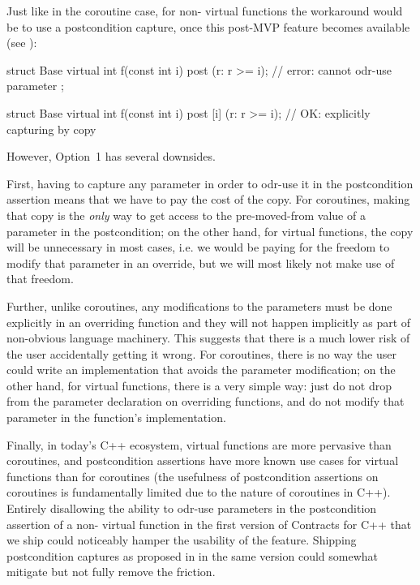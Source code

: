 Just like in the coroutine case, for non- virtual functions the workaround would be to use a postcondition capture, once this post-MVP feature becomes available (see \cite{P3098R0}):
\begin{codeblock}
struct Base {
  virtual int f(const int i) post (r: r >= i);     // error: cannot odr-use parameter  
};

struct Base {
  virtual int f(const int i) post [i] (r: r >= i); // OK: explicitly capturing  by copy
}
\end{codeblock}

However, Option~1 has several downsides.

First, having to capture any parameter in order to odr-use it in the postcondition assertion means that we have to pay the cost of the copy. For coroutines, making that copy is the \emph{only} way to get access to the pre-moved-from value of a parameter in the postcondition; on the other hand, for virtual functions, the copy will be unnecessary in most cases, i.e. we would be paying for the freedom to modify that parameter in an override, but we will most likely not make use of that freedom.

Further, unlike coroutines, any modifications to the parameters must be done explicitly in an overriding function and they will not happen implicitly as part of non-obvious language machinery. This suggests that there is a much lower risk of the user accidentally getting it wrong. For coroutines, there is no way the user could write an implementation that avoids the parameter modification; on the other hand, for virtual functions, there is a very simple way: just do not drop  from the parameter declaration on overriding functions, and do not modify that parameter in the function's implementation. 

Finally, in today's C++ ecosystem, virtual functions are more pervasive than coroutines, and postcondition assertions have more known use cases for virtual functions than for coroutines (the usefulness of postcondition assertions on coroutines is fundamentally limited due to the nature of coroutines in C++). Entirely disallowing the ability to odr-use parameters in the postcondition assertion of a non- virtual function in the first version of Contracts for C++ that we ship could noticeably hamper the usability of the feature. Shipping postcondition captures as proposed in \cite{P3098R0} in the same version could somewhat mitigate but not fully remove the friction.

